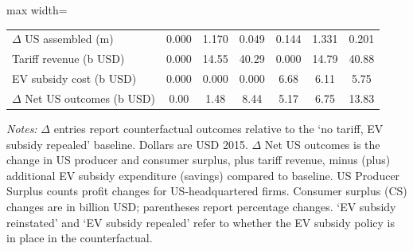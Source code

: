 \begin{table}[!htbp]
\begin{adjustbox}{max width=\textwidth}
\begin{threeparttable}
\begin{tabular}{lcccccc}
$\Delta$ US assembled (m) & 0.000 & 1.170 & 0.049 & 0.144 & 1.331 & 0.201 \\
Tariff revenue (b USD) & 0.000 & 14.55 & 40.29 & 0.000 & 14.79 & 40.88 \\
EV subsidy cost (b USD) & 0.000 & 0.000 & 0.000 & 6.68 & 6.11 & 5.75 \\
$\Delta$ Net US outcomes (b USD) & 0.00 & 1.48 & 8.44 & 5.17 & 6.75 & 13.83 \\
\bottomrule
\end{tabular}
\begin{tablenotes}[flushleft]\footnotesize
\item \textit{Notes:} $\Delta$ entries report counterfactual outcomes relative to the `no tariff, EV subsidy repealed' baseline. Dollars are USD 2015. $\Delta$ Net US outcomes is the change in US producer and consumer surplus, plus tariff revenue, minus (plus) additional EV subsidy expenditure (savings) compared to baseline. US Producer Surplus counts profit changes for US-headquartered firms. Consumer surplus (CS) changes are in billion USD; parentheses report percentage changes. `EV subsidy reinstated' and `EV subsidy repealed' refer to whether the EV subsidy policy is in place in the counterfactual.
\end{tablenotes}
\end{threeparttable}
\end{adjustbox}
\end{table}
